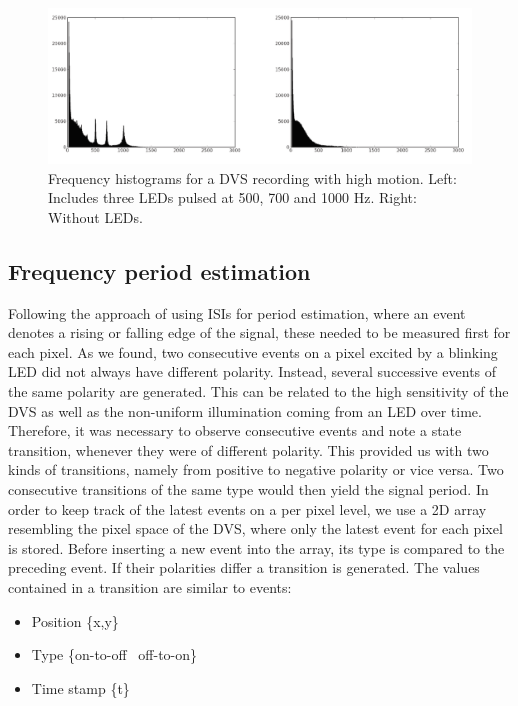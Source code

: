 \begin{figure}[h]
     \centering
     \includegraphics[width=1.0\textwidth]{img/hist_motion.png}
     \caption{Frequency histograms for a DVS recording with high motion. Left: Includes three LEDs pulsed at 500, 700 and 1000 Hz. Right: Without LEDs. }
     \label{img:hist_motion}
\end{figure}


\subsection{Frequency period estimation}\label{sec:periodestimation}

Following the approach of using ISIs for period estimation, where an event denotes a rising or falling edge of the signal, these needed to be measured first for each pixel. As we found, two consecutive events on a pixel excited by a blinking LED did not always have different polarity. Instead, several successive events of the same polarity are generated. This can be related to the high sensitivity of the DVS as well as the non-uniform illumination coming from an LED over time. Therefore, it was necessary to observe consecutive events and note a state transition, whenever they were of different polarity. This provided us with two kinds of transitions, namely from positive to negative polarity or vice versa. Two consecutive transitions of the same type would then yield the signal period. 
In order to keep track of the latest events on a per pixel level, we use a 2D array resembling the pixel space of the DVS, where only the latest event for each pixel is stored.  Before inserting a new event into the array, its type is compared to the preceding event.  If their polarities differ a transition is generated. The values contained in a transition are similar to events:

\begin{itemize}
	\item Position \{x,y\}
	\item Type \{on-to-off \textbar\ off-to-on\}
	\item Time stamp \{t\}
\end{itemize}

